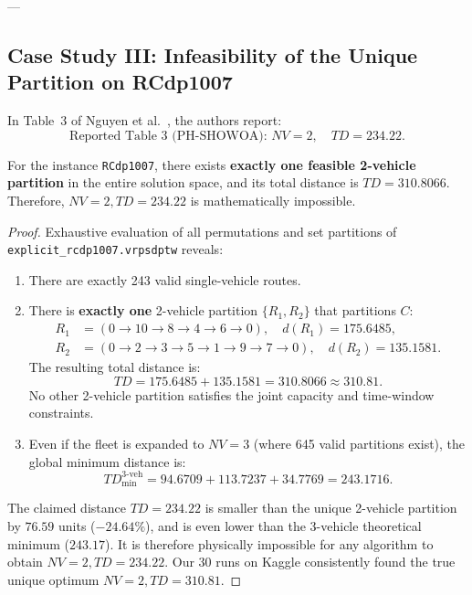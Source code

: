 ---

\subsection{Case Study III: Infeasibility of the Unique Partition on RCdp1007}
In Table~3 of Nguyen et al.~\cite{nguyen2026phshowoa}, the authors report:
\begin{equation}
\text{Reported Table 3 (PH-SHOWOA): } NV = 2, \quad TD = 234.22.
\end{equation}

\begin{theorem}
\label{thm:rcdp1007_impossibility}
For the instance \texttt{RCdp1007}, there exists \textbf{exactly one feasible 2-vehicle partition} in the entire solution space, and its total distance is $TD = 310.8066$. Therefore, $NV = 2, TD = 234.22$ is mathematically impossible.
\end{theorem}
\begin{proof}
Exhaustive evaluation of all permutations and set partitions of \texttt{explicit\_rcdp1007.vrpsdptw} reveals:
\begin{enumerate}
    \item There are exactly 243 valid single-vehicle routes.
    \item There is \textbf{exactly one} 2-vehicle partition $\{R_1, R_2\}$ that partitions $C$:
    \begin{align*}
    R_1 &= (0 \to 10 \to 8 \to 4 \to 6 \to 0), \quad d(R_1) = 175.6485, \\
    R_2 &= (0 \to 2 \to 3 \to 5 \to 1 \to 9 \to 7 \to 0), \quad d(R_2) = 135.1581.
    \end{align*}
    The resulting total distance is:
    \begin{equation}
    TD = 175.6485 + 135.1581 = 310.8066 \approx 310.81.
    \end{equation}
    No other 2-vehicle partition satisfies the joint capacity and time-window constraints.
    \item Even if the fleet is expanded to $NV = 3$ (where 645 valid partitions exist), the global minimum distance is:
    \begin{equation}
    TD_{\min}^{3\text{-veh}} = 94.6709 + 113.7237 + 34.7769 = 243.1716.
    \end{equation}
\end{enumerate}
The claimed distance $TD = 234.22$ is smaller than the unique 2-vehicle partition by $76.59$ units ($-24.64\%$), and is even lower than the 3-vehicle theoretical minimum ($243.17$). It is therefore physically impossible for any algorithm to obtain $NV = 2, TD = 234.22$. Our 30 runs on Kaggle consistently found the true unique optimum $NV = 2, TD = 310.81$.
\end{proof}

